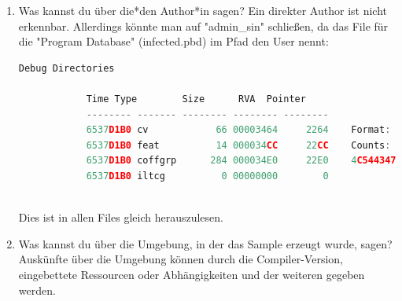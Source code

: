 \documentclass{article}
\begin{document}
\begin{enumerate}
\begin{enumerate}
			\item infected-md.exe
			\begin{enumerate}
				\item .text
				\item .rdata
				\item .data
				\item .pdata
				\item .rsrc
				\item .reloc
			\end{enumerate}
			\item infected-MDd.exe
			\begin{enumerate}
				\item .text
				\item .rdata
				\item .data
				\item .pdata
				\item .rsrc
				\item .reloc
			\end{enumerate}
		\end{enumerate}
		
		\pagebreak
		
		\item Was kannst du über die*den Author*in sagen?
		Ein direkter Author ist nicht erkennbar. Allerdings könnte man auf "admin\_sin" schließen, da das File für die "Program Database" (infected.pbd) im Pfad den User nennt:\\
		\begin{lstlisting}[language=c]
			 Debug Directories
			
			Time Type        Size      RVA  Pointer
			-------- ------- -------- -------- --------
			6537D1B0 cv            66 00003464     2264    Format: RSDS, {6F72B84A-D687-4743-A104-E88EF40E7E96}, 4, C:\Users\admin_sin\Desktop\rev3-s2210239021\infected\x64\Release\infected.pdb
			6537D1B0 feat          14 000034CC     22CC    Counts: Pre-VC++ 11.00=0, C/C++=30, /GS=30, /sdl=1, guardN=29
			6537D1B0 coffgrp      284 000034E0     22E0    4C544347 (LTCG)
			6537D1B0 iltcg          0 00000000        0
			
		\end{lstlisting}
		
		\noindent Dies ist in allen Files gleich herauszulesen.\\
		
		\item Was kannst du über die Umgebung, in der das Sample erzeugt wurde, sagen?\\
		Auskünfte über die Umgebung können durch die Compiler-Version, eingebettete Ressourcen oder Abhängigkeiten und der weiteren gegeben werden.\\
		
	\end{enumerate}
	
\end{document}
